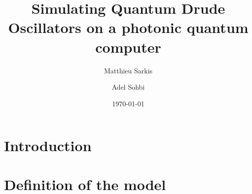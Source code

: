 \documentclass[reprint, amsmath, amssymb, aps]{revtex4-2}
\begin{document}
\preprint{}

\title{Simulating Quantum Drude Oscillators on a photonic quantum computer}

\author{Matthieu Sarkis}


\author{Adel Sohbi}



\date{\today}

\begin{abstract}
\end{abstract}

\maketitle


\section{Introduction}


\section{Definition of the model}
\end{document}
